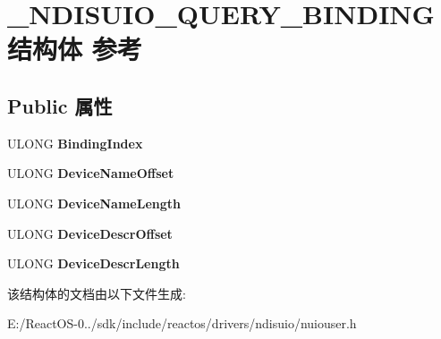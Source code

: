 \hypertarget{struct___n_d_i_s_u_i_o___q_u_e_r_y___b_i_n_d_i_n_g}{}\section{\+\_\+\+N\+D\+I\+S\+U\+I\+O\+\_\+\+Q\+U\+E\+R\+Y\+\_\+\+B\+I\+N\+D\+I\+N\+G结构体 参考}
\label{struct___n_d_i_s_u_i_o___q_u_e_r_y___b_i_n_d_i_n_g}
\subsection*{Public 属性}
\begin{DoxyCompactItemize}
\item 
\mbox{\label{struct___n_d_i_s_u_i_o___q_u_e_r_y___b_i_n_d_i_n_g_acbaf320d11594491042bf5f34c16834f}} 
U\+L\+O\+NG {\bfseries Binding\+Index}
\item 
\mbox{\label{struct___n_d_i_s_u_i_o___q_u_e_r_y___b_i_n_d_i_n_g_a276206882e3ebba42cc28f7f58e7b998}} 
U\+L\+O\+NG {\bfseries Device\+Name\+Offset}
\item 
\mbox{\label{struct___n_d_i_s_u_i_o___q_u_e_r_y___b_i_n_d_i_n_g_a7bb39c1fe6938245eef684dcaa285f42}} 
U\+L\+O\+NG {\bfseries Device\+Name\+Length}
\item 
\mbox{\label{struct___n_d_i_s_u_i_o___q_u_e_r_y___b_i_n_d_i_n_g_a73f798d87cb494b710ae7762f664c376}} 
U\+L\+O\+NG {\bfseries Device\+Descr\+Offset}
\item 
\mbox{\label{struct___n_d_i_s_u_i_o___q_u_e_r_y___b_i_n_d_i_n_g_a4fa20a69a2a186c88a97a19901b10f6a}} 
U\+L\+O\+NG {\bfseries Device\+Descr\+Length}
\end{DoxyCompactItemize}


该结构体的文档由以下文件生成\+:\begin{DoxyCompactItemize}
\item 
E\+:/\+React\+O\+S-\/0../sdk/include/reactos/drivers/ndisuio/nuiouser.\+h\end{DoxyCompactItemize}
